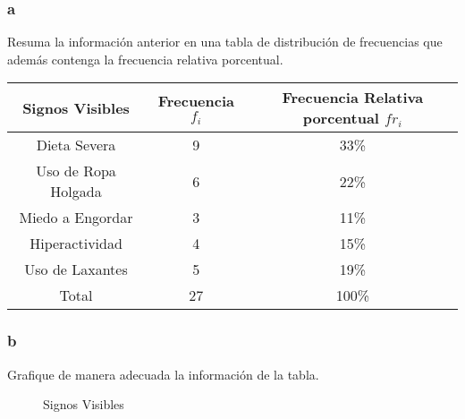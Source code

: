\documentclass{templateNote}
\begin{document}
\begin{samepage}
    \subsubsection{a}
    \indent
    Resuma la información anterior en una tabla de distribución de frecuencias que además contenga la frecuencia relativa porcentual.
    \begin{table}[H]
        \begin{center}
            \begin{tabular}{| c | c | c |}
                \hline
                Signos Visibles & Frecuencia $f_i$ & Frecuencia Relativa porcentual $fr_i$ \\
                \hline
                Dieta Severa & 9 & 33\% \\
                Uso de Ropa Holgada & 6 & 22\% \\
                Miedo a Engordar & 3 & 11\% \\
                Hiperactividad & 4 & 15\% \\
                Uso de Laxantes & 5 & 19\% \\
                \hline
                Total & 27 & 100\% \\
                \hline
            \end{tabular}
        \end{center}
    \end{table}
\end{samepage}
\newpage
\subsubsection{b}
\indent
Grafique de manera adecuada la información de la tabla.

\begin{figure}[H]
    \begin{center}
        \caption{Signos Visibles}
    \end{center}
\end{figure}
\end{document}
